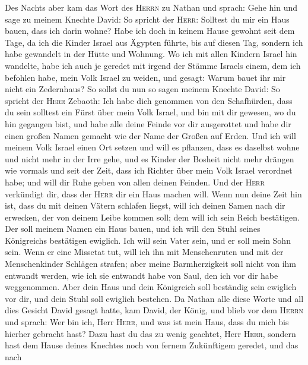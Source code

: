  Des Nachts aber kam das Wort des \textsc{Herrn} zu Nathan
und sprach:  Gehe hin und sage zu meinem Knechte David: So
spricht der \textsc{Herr}: Solltest du mir ein Haus bauen, dass ich
darin wohne?  Habe ich doch in keinem Hause gewohnt seit
dem Tage, da ich die Kinder Israel aus Ägypten führte, bis auf diesen
Tag, sondern ich habe gewandelt in der Hütte und Wohnung. 
Wo ich mit allen Kindern Israel hin wandelte, habe ich auch je geredet
mit irgend der Stämme Israels einem, dem ich befohlen habe, mein Volk
Israel zu weiden, und gesagt: Warum bauet ihr mir nicht ein Zedernhaus?
 So sollst du nun so sagen meinem Knechte David: So
spricht der \textsc{Herr} Zebaoth: Ich habe dich genommen von den
Schafhürden, dass du sein solltest ein Fürst über mein Volk Israel,
 und bin mit dir gewesen, wo du hin gegangen bist, und
habe alle deine Feinde vor dir ausgerottet und habe dir einen großen
Namen gemacht wie der Name der Großen auf Erden.  Und ich
will meinem Volk Israel einen Ort setzen und will es pflanzen, dass es
daselbst wohne und nicht mehr in der Irre gehe, und es Kinder der
Bosheit nicht mehr drängen wie vormals und seit der Zeit, dass ich
Richter über mein Volk Israel verordnet habe;  und will
dir Ruhe geben von allen deinen Feinden. Und der \textsc{Herr}
verkündigt dir, dass der \textsc{Herr} dir ein Haus machen will.
 Wenn nun deine Zeit hin ist, dass du mit deinen Vätern
schlafen liegst, will ich deinen Samen nach dir erwecken, der von deinem
Leibe kommen soll; dem will ich sein Reich bestätigen. 
Der soll meinem Namen ein Haus bauen, und ich will den Stuhl seines
Königreichs bestätigen ewiglich.  Ich will sein Vater
sein, und er soll mein Sohn sein. Wenn er eine Missetat tut, will ich
ihn mit Menschenruten und mit der Menschenkinder Schlägen strafen;
 aber meine Barmherzigkeit soll nicht von ihm entwandt
werden, wie ich sie entwandt habe von Saul, den ich vor dir habe
weggenommen.  Aber dein Haus und dein Königreich soll
beständig sein ewiglich vor dir, und dein Stuhl soll ewiglich bestehen.
 Da Nathan alle diese Worte und all dies Gesicht David
gesagt hatte,  kam David, der König, und blieb vor dem
\textsc{Herrn} und sprach: Wer bin ich, Herr \textsc{Herr}, und was ist
mein Haus, dass du mich bis hierher gebracht hast?  Dazu
hast du das zu wenig geachtet, Herr \textsc{Herr}, sondern hast dem
Hause deines Knechtes noch von fernem Zukünftigem geredet, und das nach

